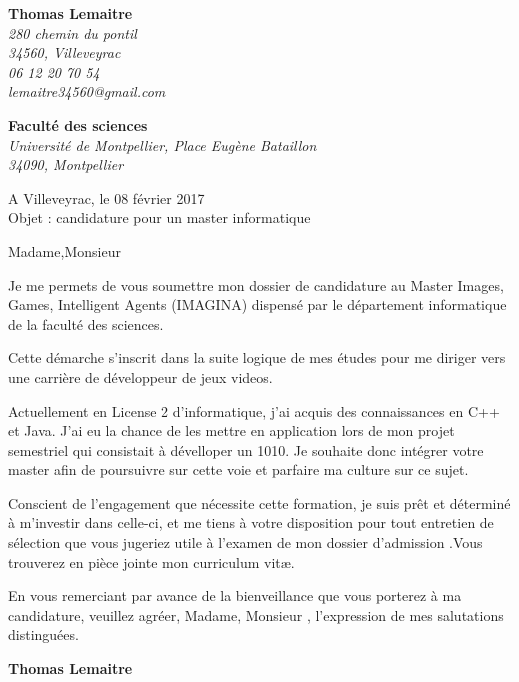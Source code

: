 \documentclass[11pt]{letter}
\begin{document}
 \sffamily
 \hfill
 \begin{flushleft}
 {\bfseries Thomas Lemaitre}\\[.35ex]
 \small\itshape
 280 chemin du pontil\\
 34560, Villeveyrac\\[.35ex]
 06 12 20 70 54\\
 lemaitre34560@gmail.com
 \end{flushleft}
 \begin{flushright}
 {\bfseries Faculté des sciences}\\[.35ex]
 \small\itshape
Université de Montpellier, Place Eugène Bataillon\\
 34090, Montpellier
 \end{flushright}
 \hfill
 \begin{flushright}
 A Villeveyrac, le 08 février 2017 \\
 Objet : candidature pour un master informatique
 \end{flushright}
 Madame,Monsieur
 
 Je me permets de vous soumettre mon dossier de candidature au Master Images, Games, Intelligent Agents (IMAGINA) dispensé par le département informatique de la faculté des sciences.
 
Cette démarche s’inscrit dans la suite logique de mes études pour me diriger vers une carrière de développeur de jeux videos.
 
Actuellement en License 2 d'informatique, j’ai acquis des connaissances en C++ et Java. J'ai eu la chance de les mettre en application lors de mon projet semestriel qui consistait à dévelloper un 1010. Je souhaite donc intégrer votre master afin de poursuivre sur cette voie et parfaire ma culture sur ce sujet.
 
 
Conscient de l’engagement que nécessite cette formation, je suis prêt et déterminé à m’investir dans celle-ci, et me tiens à votre disposition pour tout  entretien de sélection que vous jugeriez utile à l’examen de mon dossier d’admission .Vous trouverez en pièce jointe mon curriculum vitæ.
 
En vous remerciant par avance de la bienveillance que vous porterez à ma candidature, veuillez agréer, Madame, Monsieur , l’expression de mes salutations distinguées.

 \begin{center}
 {\bfseries Thomas Lemaitre}
 \end{center}
 \vfill
 
\end{document}
